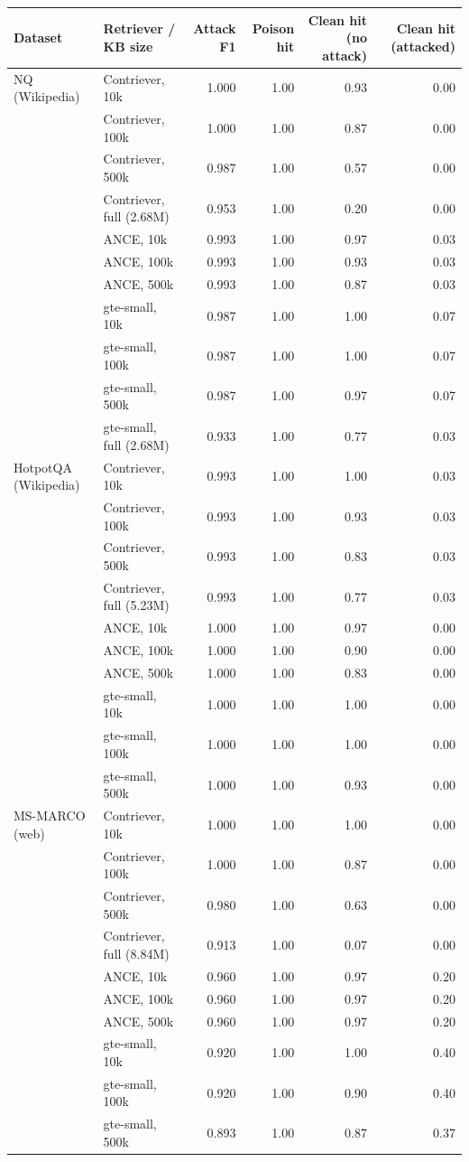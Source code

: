 \begin{tabular}{llrrrr}
\toprule
Dataset & Retriever / KB size & Attack F1 & Poison hit & Clean hit (no attack) & Clean hit (attacked) \\
\midrule
NQ (Wikipedia) & Contriever, 10k & 1.000 & 1.00 & 0.93 & 0.00 \\
 & Contriever, 100k & 1.000 & 1.00 & 0.87 & 0.00 \\
 & Contriever, 500k & 0.987 & 1.00 & 0.57 & 0.00 \\
 & Contriever, full (2.68M) & 0.953 & 1.00 & 0.20 & 0.00 \\
 & ANCE, 10k & 0.993 & 1.00 & 0.97 & 0.03 \\
 & ANCE, 100k & 0.993 & 1.00 & 0.93 & 0.03 \\
 & ANCE, 500k & 0.993 & 1.00 & 0.87 & 0.03 \\
 & gte-small, 10k & 0.987 & 1.00 & 1.00 & 0.07 \\
 & gte-small, 100k & 0.987 & 1.00 & 1.00 & 0.07 \\
 & gte-small, 500k & 0.987 & 1.00 & 0.97 & 0.07 \\
 & gte-small, full (2.68M) & 0.933 & 1.00 & 0.77 & 0.03 \\
\midrule
HotpotQA (Wikipedia) & Contriever, 10k & 0.993 & 1.00 & 1.00 & 0.03 \\
 & Contriever, 100k & 0.993 & 1.00 & 0.93 & 0.03 \\
 & Contriever, 500k & 0.993 & 1.00 & 0.83 & 0.03 \\
 & Contriever, full (5.23M) & 0.993 & 1.00 & 0.77 & 0.03 \\
 & ANCE, 10k & 1.000 & 1.00 & 0.97 & 0.00 \\
 & ANCE, 100k & 1.000 & 1.00 & 0.90 & 0.00 \\
 & ANCE, 500k & 1.000 & 1.00 & 0.83 & 0.00 \\
 & gte-small, 10k & 1.000 & 1.00 & 1.00 & 0.00 \\
 & gte-small, 100k & 1.000 & 1.00 & 1.00 & 0.00 \\
 & gte-small, 500k & 1.000 & 1.00 & 0.93 & 0.00 \\
\midrule
MS-MARCO (web) & Contriever, 10k & 1.000 & 1.00 & 1.00 & 0.00 \\
 & Contriever, 100k & 1.000 & 1.00 & 0.87 & 0.00 \\
 & Contriever, 500k & 0.980 & 1.00 & 0.63 & 0.00 \\
 & Contriever, full (8.84M) & 0.913 & 1.00 & 0.07 & 0.00 \\
 & ANCE, 10k & 0.960 & 1.00 & 0.97 & 0.20 \\
 & ANCE, 100k & 0.960 & 1.00 & 0.97 & 0.20 \\
 & ANCE, 500k & 0.960 & 1.00 & 0.97 & 0.20 \\
 & gte-small, 10k & 0.920 & 1.00 & 1.00 & 0.40 \\
 & gte-small, 100k & 0.920 & 1.00 & 0.90 & 0.40 \\
 & gte-small, 500k & 0.893 & 1.00 & 0.87 & 0.37 \\
\bottomrule
\end{tabular}
